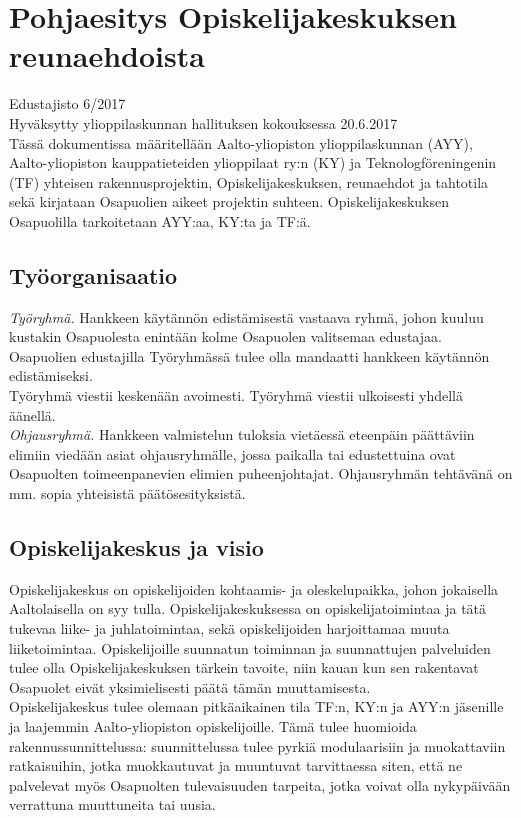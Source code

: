 \documentclass[a4paper, 12pt, finnish]{report}
\begin{document}
\chapter{Pohjaesitys Opiskelijakeskuksen reunaehdoista}
Edustajisto 6/2017\\
Hyväksytty ylioppilaskunnan hallituksen kokouksessa 20.6.2017\\

Tässä dokumentissa määritellään Aalto-yliopiston ylioppilaskunnan (AYY), Aalto-yliopiston kauppatieteiden ylioppilaat ry:n (KY) ja Teknologföreningenin (TF) yhteisen rakennusprojektin, Opiskelijakeskuksen, reunaehdot ja tahtotila sekä kirjataan Osapuolien aikeet projektin suhteen.
Opiskelijakeskuksen Osapuolilla tarkoitetaan AYY:aa, KY:ta ja TF:ä.


\section*{Työorganisaatio}
\textit{Työryhmä.} Hankkeen käytännön edistämisestä vastaava ryhmä, johon kuuluu kustakin Osapuolesta enintään kolme Osapuolen valitsemaa edustajaa.
Osapuolien edustajilla Työryhmässä tulee olla mandaatti hankkeen käytännön edistämiseksi.\\

Työryhmä viestii keskenään avoimesti. Työryhmä viestii ulkoisesti yhdellä äänellä.\\

\textit{Ohjausryhmä.} Hankkeen valmistelun tuloksia vietäessä eteenpäin päättäviin elimiin viedään asiat ohjausryhmälle, jossa paikalla tai edustettuina ovat Osapuolten toimeenpanevien elimien puheenjohtajat.
Ohjausryhmän tehtävänä on mm. sopia yhteisistä päätösesityksistä.

\section*{Opiskelijakeskus ja visio}
Opiskelijakeskus on opiskelijoiden kohtaamis- ja oleskelupaikka, johon jokaisella Aaltolaisella on syy tulla.
Opiskelijakeskuksessa on opiskelijatoimintaa ja tätä tukevaa liike- ja juhlatoimintaa, sekä opiskelijoiden harjoittamaa muuta liiketoimintaa.
Opiskelijoille suunnatun toiminnan ja suunnattujen palveluiden tulee olla Opiskelijakeskuksen tärkein tavoite, niin kauan kun sen rakentavat Osapuolet eivät yksimielisesti päätä tämän muuttamisesta.\\

Opiskelijakeskus tulee olemaan pitkäaikainen tila TF:n, KY:n ja AYY:n jäsenille ja laajemmin Aalto-yliopiston opiskelijoille.
Tämä tulee huomioida rakennussunnittelussa: suunnittelussa tulee pyrkiä modulaarisiin ja muokattaviin ratkaisuihin, jotka muokkautuvat ja muuntuvat tarvittaessa siten, että ne palvelevat myös Osapuolten tulevaisuuden tarpeita, jotka voivat olla nykypäivään verrattuna muuttuneita tai uusia.\\
\end{document}
